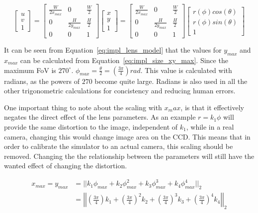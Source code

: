 \begin{equation}
    \begin{bmatrix}
        u \\ v \\ 1
    \end{bmatrix} = \begin{bmatrix}
        \frac{W}{2x_{max}} & 0 & \frac{W}{2} \\
        0 & \frac{H}{2y_{max}} & \frac{H}{2} \\
        0 & 0 & 1
    \end{bmatrix}\begin{bmatrix}
        x \\ y \\ 1
    \end{bmatrix} =
    \begin{bmatrix}
        \frac{W}{2x_{max}} & 0 & \frac{W}{2} \\
        0 & \frac{H}{2y_{max}} & \frac{H}{2} \\
        0 & 0 & 1
    \end{bmatrix}\begin{bmatrix}
        r(\phi) cos(\theta) \\ r(\phi) sin(\theta) \\ 1
    \end{bmatrix}
    \label{eq:impl_pixel_transform_final}
\end{equation}

It can be seen from Equation~\eqref{eq:impl_lens_model} that the values for $y_{max}$ and $x_{max}$ can be calculated from Equation~\eqref{eq:impl_size_xy_max}. Since the maximum FoV is $270^\circ$.  $\phi_{max} = \frac{\theta}{2} = \left(\frac{3 \pi}{4}\right) rad$. This value is calculated with radians, as the powers of $270$ become quite large. Radians is also used in all the other trigonometric calculations for concistency and reducing human errors. 

One important thing to note about the scaling with $x_max$, is that it effectively negates the direct effect of the lens parameters. As an example $r = k_1 \phi$ will provide the same distortion to the image, independent of $k_1$, while in a real camera, changing this would change image area on the CCD. This means that in order to calibrate the simulator to an actual camera, this scaling should be removed. Changing the the relationship between the parameters will still have the wanted effect of changing the distortion.

\begin{equation}
    \begin{aligned}
        x_{max} = y_{max} &= ||k_1 \phi_{max} + k_2 \phi_{max}^2 + k_3 \phi_{max}^3 + k_4 \phi_{max}^4 ||_2 \\
        &= \left|\left| \left(\frac{3 \pi}{4}\right)k_1 + \left(\frac{3 \pi}{4}\right)^2 k_2 + \left(\frac{3 \pi}{4}\right)^3 k_3 + \left(\frac{3 \pi}{4}\right)^4 k_4 \right|\right|_2
    \end{aligned}
    \label{eq:impl_size_xy_max}
\end{equation}

